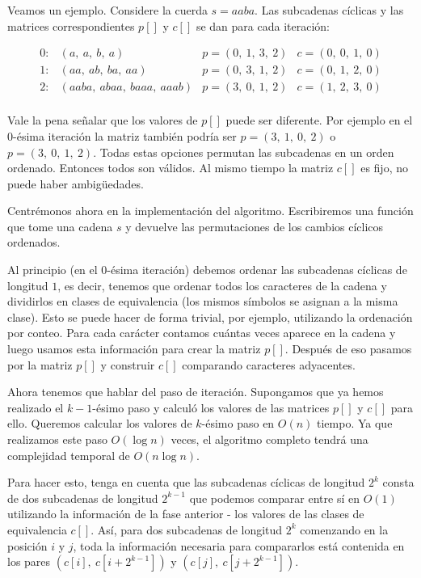 Veamos un ejemplo. Considere la cuerda $s = aaba$. Las subcadenas cíclicas y las matrices correspondientes $p[]$ y $c[]$ se dan para cada iteración:

$$\begin{array}{cccc} 0: & (a,~ a,~ b,~ a) & p = (0,~ 1,~ 3,~ 2) & c = (0,~ 0,~ 1,~ 0)\\ 1: & (aa,~ ab,~ ba,~ aa) & p = (0,~ 3,~ 1,~ 2) & c = (0,~ 1,~ 2,~ 0)\\ 2: & (aaba,~ abaa,~ baaa,~ aaab) & p = (3,~ 0,~ 1,~ 2) & c = (1,~ 2,~ 3,~ 0)\\ \end{array}$$

Vale la pena señalar que los valores de $p[]$ puede ser diferente. Por ejemplo en el $0$-ésima iteración la matriz también podría ser $p=(3,~1,~0,~2)$ o
$p=(3,~0,~1,~2)$. Todas estas opciones permutan las subcadenas en un orden ordenado. Entonces todos son válidos. Al mismo tiempo la matriz $c[]$ es fijo, no 
puede haber ambigüedades.

Centrémonos ahora en la implementación del algoritmo. Escribiremos una función que tome una cadena $s$ y devuelve las permutaciones de los cambios cíclicos ordenados.

Al principio (en el $0$-ésima iteración) debemos ordenar las subcadenas cíclicas de longitud $1$, es decir, tenemos que ordenar todos los caracteres de la 
cadena y dividirlos en clases de equivalencia (los mismos símbolos se asignan a la misma clase). Esto se puede hacer de forma trivial, por ejemplo, utilizando 
la ordenación por conteo. Para cada carácter contamos cuántas veces aparece en la cadena y luego usamos esta información para crear la matriz $p[]$. Después 
de eso pasamos por la matriz $p[]$ y construir $c[]$ comparando caracteres adyacentes.

Ahora tenemos que hablar del paso de iteración. Supongamos que ya hemos realizado el $k-1$-ésimo paso y calculó los valores de las matrices $p[]$ y $c[]$ para ello. Queremos calcular los valores de $k$-ésimo paso en $O(n)$ tiempo. Ya que realizamos este paso $O(\log n)$ veces, el algoritmo completo tendrá una complejidad temporal de $O(n \log n)$.

Para hacer esto, tenga en cuenta que las subcadenas cíclicas de longitud $2^k$ consta de dos subcadenas de longitud $2^{k-1}$ que podemos comparar entre sí en $O(1)$ utilizando la información de la fase anterior - los valores de las clases de equivalencia $c[]$. Así, para dos subcadenas de longitud $2^k$ comenzando en la posición $i$ y $j$, toda la información necesaria para compararlos está contenida en los pares $(c[i],~ c[i+2^{k-1}])$ y $(c[j],~c[j+2^{k-1}])$.

